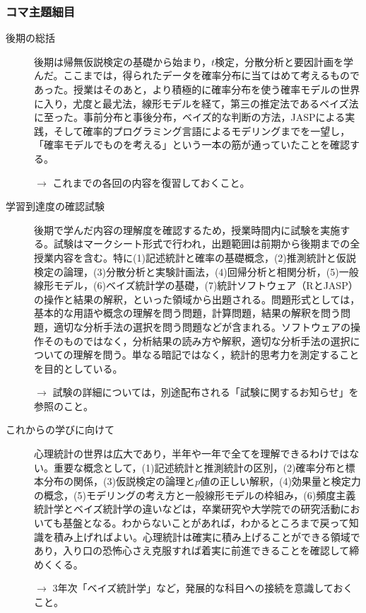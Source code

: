 \subsubsection{コマ主題細目}
\begin{description}
	\item[後期の総括] 後期は帰無仮説検定の基礎から始まり，$t$検定，分散分析と要因計画を学んだ。ここまでは，得られたデータを確率分布に当てはめて考えるものであった。授業はそのあと，より積極的に確率分布を使う確率モデルの世界に入り，尤度と最尤法，線形モデルを経て，第三の推定法であるベイズ法に至った。事前分布と事後分布，ベイズ的な判断の方法，JASPによる実践，そして確率的プログラミング言語によるモデリングまでを一望し，「確率モデルでものを考える」という一本の筋が通っていたことを確認する。
	      \begin{flushright}
		      $\to$ これまでの各回の内容を復習しておくこと。
	      \end{flushright}

	\item[学習到達度の確認試験] 後期で学んだ内容の理解度を確認するため，授業時間内に試験を実施する。試験はマークシート形式で行われ，出題範囲は前期から後期までの全授業内容を含む。特に(1)記述統計と確率の基礎概念，(2)推測統計と仮説検定の論理，(3)分散分析と実験計画法，(4)回帰分析と相関分析，(5)一般線形モデル，(6)ベイズ統計学の基礎，(7)統計ソフトウェア（RとJASP）の操作と結果の解釈，といった領域から出題される。問題形式としては，基本的な用語や概念の理解を問う問題，計算問題，結果の解釈を問う問題，適切な分析手法の選択を問う問題などが含まれる。ソフトウェアの操作そのものではなく，分析結果の読み方や解釈，適切な分析手法の選択についての理解を問う。単なる暗記ではなく，統計的思考力を測定することを目的としている。
	      \begin{flushright}
		      $\to$ 試験の詳細については，別途配布される「試験に関するお知らせ」を参照のこと。
	      \end{flushright}

	\item[これからの学びに向けて] 心理統計の世界は広大であり，半年や一年で全てを理解できるわけではない。重要な概念として，(1)記述統計と推測統計の区別，(2)確率分布と標本分布の関係，(3)仮説検定の論理と$p$値の正しい解釈，(4)効果量と検定力の概念，(5)モデリングの考え方と一般線形モデルの枠組み，(6)頻度主義統計学とベイズ統計学の違いなどは，卒業研究や大学院での研究活動においても基盤となる。わからないことがあれば，わかるところまで戻って知識を積み上げればよい。心理統計は確実に積み上げることができる領域であり，入り口の恐怖心さえ克服すれば着実に前進できることを確認して締めくくる。
	      \begin{flushright}
		      $\to$ 3年次「ベイズ統計学」など，発展的な科目への接続を意識しておくこと。
	      \end{flushright}

\end{description}
